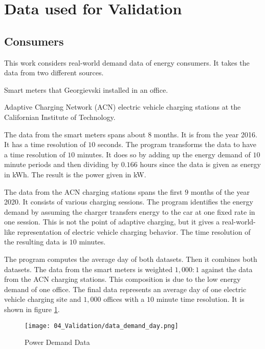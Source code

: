 \section{Data used for Validation}
\label{evaluation:data}

\subsection{Consumers}

This work considers real-world demand data of energy consumers.
It takes the data from two different sources.
\begin{enumerate*}[label=(\roman*)]
  \item Smart meters that Georgievski \citeauthor{Georgievski2012} installed in an office. \cite{Georgievski2012}
  \item Adaptive Charging Network (ACN) electric vehicle charging stations at the Californian Institute of Technology. \cite{Lee2019, ACNCaltech2020}
\end{enumerate*}

The data from the smart meters spans about $8$ months.
It is from the year 2016.
It has a time resolution of $10$ seconds.
The program transforms the data to have a time resolution of $10$ minutes.
It does so by adding up the energy demand of $10$ minute periods and then dividing by $0.166$ hours since the data is given as energy in kWh.
The result is the power given in kW.

The data from the ACN charging stations spans the first $9$ months of the year 2020.
It consists of various charging sessions.
The program identifies the energy demand by assuming the charger transfers energy to the car at one fixed rate in one session.
This is not the point of adaptive charging, but it gives a real-world-like representation of electric vehicle charging behavior.
The time resolution of the resulting data is $10$ minutes.

The program computes the average day of both datasets.
Then it combines both datasets.
The data from the smart meters is weighted $1, 000 : 1$ against the data from the ACN charging stations.
This composition is due to the low energy demand of one office.
The final data represents an average day of one electric vehicle charging site and $1, 000$ offices with a $10$ minute time resolution.
It is shown in figure \ref{figure:data.demand.day}.

\begin{figure}
  \centering
  \texttt{[image: 04\_Validation/data\_demand\_day.png]}
  \caption{Power Demand Data}
  \label{figure:data.demand.day}
\end{figure}

